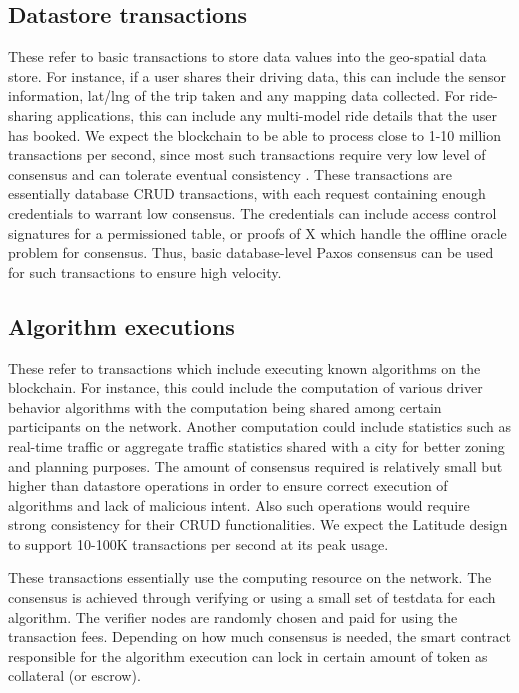 \subsection{Datastore transactions}
These refer to basic transactions to store data values into the geo-spatial data
store. For instance, if a user shares their driving data, this can include the sensor information, lat/lng of the trip
taken and any mapping data collected. For ride-sharing applications, this can include any multi-model ride details that
the user has booked. We expect the blockchain to be able to process close to 1-10 million transactions per second, since
most such transactions require very low level of consensus and can tolerate eventual consistency \cite{eventual_con}.
These transactions are essentially database CRUD transactions, with each request containing enough credentials to
warrant low consensus. The credentials can include access control signatures for a permissioned table, or proofs of X
which handle the offline oracle problem for consensus. Thus, basic database-level Paxos consensus can be used for such
transactions to ensure high velocity. 

\subsection{Algorithm executions}
These refer to transactions which include executing known algorithms on the blockchain. For instance, this could include
the computation of various driver behavior algorithms with the computation being shared among certain participants on
the network. Another computation could include statistics such as real-time traffic or aggregate traffic statistics
shared with a city for better zoning and planning purposes. The amount of consensus required is relatively small but
higher than datastore operations in order to ensure correct execution of algorithms and lack of malicious intent. Also
such operations would require strong consistency for their CRUD functionalities. We expect the Latitude design to
support 10-100K transactions per second at its peak usage.

These transactions essentially use the computing resource on the network. The consensus is achieved through verifying or
using a small set of testdata for each algorithm. The verifier nodes are randomly chosen and paid for using the
transaction fees. Depending on how much consensus is needed, the smart contract responsible for the algorithm execution
can lock in certain amount of token as collateral (or escrow).

